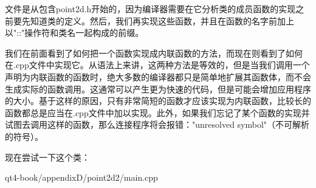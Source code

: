 \documentclass[11pt,oneside]{book}
\begin{document}
\begin{common-format}
文件是从包含point2d.h开始的，因为编译器需要在它分析类的成员函数的实现之前要先知道类的定义。然后，我们再实现这些函数，并且在函数的名字前加上以"::"操作符和类名一起构成的前缀。

我们在前面看到了如何把一个函数实现成内联函数的方法，而现在则看到了如何在.cpp文件中实现它。从语法上来讲，这两种方法是等效的，但是当我们调用一个声明为内联函数的函数时，绝大多数的编译器都只是简单地扩展其函数体，而不会生成实际的函数调用。这通常可以产生更为快速的代码，但是可能会增加应用程序的大小。基于这样的原因，只有非常简短的函数才应该实现为内联函数，比较长的函数都总是应当在.cpp文件中加以实现。此外，如果我们忘记了某个函数的实现并试图去调用这样的函数，那么连接程序将会报错："unresolved symbol"（不可解析的符号）。

现在尝试一下这个类：
\begin{cppinput}{qt4-book/appendixD/point2d2/main.cpp}
\end{cppinput}



\end{common-format}
\end{document}
